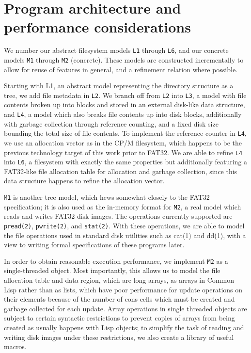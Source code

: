 \documentclass[submission,copyright,creativecommons]{eptcs}
\begin{document}
\section{Program architecture and performance considerations}

We number our abstract filesystem models \texttt{L1} through
\texttt{L6}, and our concrete models \texttt{M1} through \texttt{M2}
(concrete). These models are constructed incrementally to allow for
reuse of features in general, and a refinement relation where
possible.

Starting with L1, an abstract model representing the directory
structure as a tree, we add file
metadata in \texttt{L2}. We branch off from \texttt{L2} into
\texttt{L3}, a model with file contents broken up into blocks and
stored in an external disk-like data structure, and \texttt{L4}, a
model which also breaks file contents up into disk blocks,
additionally with garbage collection through reference counting, and a
fixed disk size bounding the total size of file contents. To implement
the reference counter in \texttt{L4}, we use an allocation vector as
in the CP/M filesystem, which happens to be the previous technology
target of this work prior to FAT32. We are able to refine \texttt{L4}
into \texttt{L6}, a filesystem with exactly the same properties but
additionally featuring a FAT32-like file allocation table for
allocation and garbage collection, since this data structure happens
to refine the allocation vector.

\texttt{M1} is another tree model, which hews somewhat closely to the
FAT32 specification; it is also used as the in-memory format for
\texttt{M2}, a real model which reads and writes FAT32 disk
images. The operations currently supported are \texttt{pread(2)},
\texttt{pwrite(2)}, and \texttt{stat(2)}. With these operations, we
are able to model the file operations used in standard disk utilities
such as cat(1) and dd(1), with a view to writing formal specifications
of these programs later.

In order to obtain reasonable execution performance, we implement
\texttt{M2} as a single-threaded object. Most importantly, this allows
us to model the file allocation table and data region, which are long
arrays, as arrays in Common Lisp rather than as lists, which have poor
performance for update operations on their elements because of the
number of cons cells which must be created and garbage collected for
each update. Array operations in single threaded objects are subject
to certain syntactic restrictions to prevent copies of arrays from
being created as usually happens with Lisp objects; to simplify the
task of reading and writing disk images under these restrictions, we
also create a library of useful macros.
\end{document}
